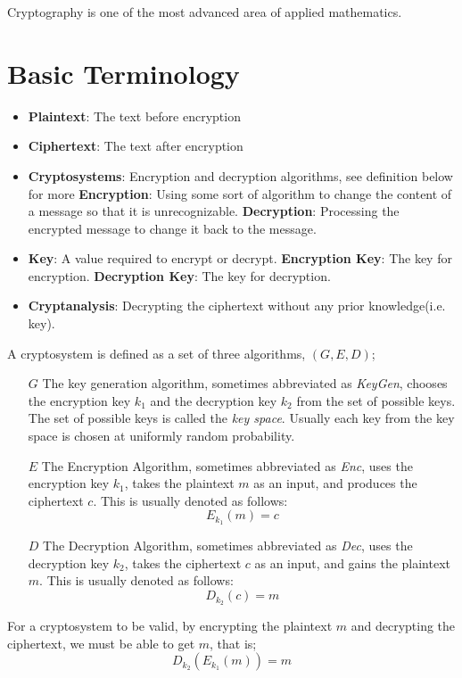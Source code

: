 \documentclass{report}
\begin{document}
	Cryptography is one of the most advanced area of applied mathematics.
	\section{Basic Terminology}
		\begin{defn}
			\begin{itemize}
				\item[]
				\item \textbf{Plaintext}: The text before encryption
				\item \textbf{Ciphertext}: The text after encryption
				\item \textbf{Cryptosystems}: Encryption and decryption algorithms, see definition below for more
				\subitem \textbf{Encryption}: Using some sort of algorithm to change the content of a message so that it is unrecognizable.
				\subitem \textbf{Decryption}: Processing the encrypted message to change it back to the message.
				\item \textbf{Key}: A value required to encrypt or decrypt.
				\subitem \textbf{Encryption Key}: The key for encryption.
				\subitem \textbf{Decryption Key}: The key for decryption.
				\item \textbf{Cryptanalysis}: Decrypting the ciphertext without any prior knowledge(i.e. key).
			\end{itemize}
		\end{defn}
		
		\begin{defn}[Cryptosystem]
			A cryptosystem is defined as a set of three algorithms, $(G,E,D)$;
			\begin{itemize}
				\item[$G$]
				\subitem The key generation algorithm, sometimes abbreviated as \emph{KeyGen}, chooses the encryption key $k_1$ and the decryption key $k_2$ from the set of possible keys. The set of possible keys is called the \emph{key space}. Usually each key from the key space is chosen at uniformly random probability.
				\item[$E$]
				\subitem The Encryption Algorithm, sometimes abbreviated as \emph{Enc}, uses the encryption key $k_1$, takes the plaintext $m$ as an input, and produces the ciphertext $c$. This is usually denoted as follows:
				\begin{displaymath}
					E_{k_1}(m)=c
				\end{displaymath}
				\item[$D$]
				\subitem The Decryption Algorithm, sometimes abbreviated as \emph{Dec}, uses the decryption key $k_2$, takes the ciphertext $c$ as an input, and gains the plaintext $m$. This is usually denoted as follows:
				\begin{displaymath}
					D_{k_2}(c)=m
				\end{displaymath}
			\end{itemize}
			For a cryptosystem to be valid, by encrypting the plaintext $m$ and decrypting the ciphertext, we must be able to get $m$, that is;
			\begin{displaymath}
				D_{k_2}(E_{k_1}(m))=m
			\end{displaymath}
		\end{defn}
		
\end{document}
